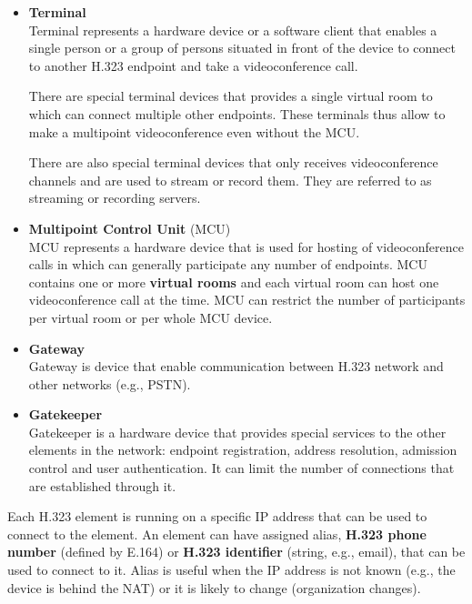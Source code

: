 \documentclass[a4paper]{report}
\begin{document}
\begin{itemize}

\item \textbf{Terminal} \\
Terminal represents a hardware device or a software client that enables a single person or a group of persons situated in front of the device to connect to another H.323 endpoint and take a videoconference call.

There are special terminal devices that provides a single virtual room to which can connect multiple other endpoints.  These terminals thus allow to make a multipoint videoconference even without the MCU.

There are also special terminal devices that only receives videoconference channels and are used to stream or record them. They are referred to as streaming or recording servers.

\item \textbf{Multipoint Control Unit} (MCU) \\
MCU represents a hardware device that is used for hosting of videoconference calls in which can generally participate any number of endpoints. MCU contains one or more \textbf{virtual rooms} and each virtual room can host one videoconference call at the time. MCU can restrict the number of participants per virtual room or per whole MCU device.

\item \textbf{Gateway} \\
Gateway is device that enable communication between H.323 network and other networks (e.g., PSTN).

\item \textbf{Gatekeeper} \\
Gatekeeper is a hardware device that provides special services to the other elements in the network: endpoint registration, address resolution, admission control and user authentication. It can limit the number of connections that are established through it.

\end{itemize}

Each H.323 element is running on a specific IP address that can be used to connect to the element. An element can have assigned alias, \textbf{H.323 phone number} (defined by E.164) or \textbf{H.323 identifier} (string, e.g., email), that can be used to connect to it. Alias is useful when the IP address is not known (e.g., the device is behind the NAT) or it is likely to change (organization changes).
\end{document}
